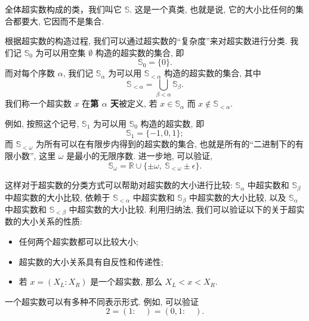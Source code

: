 全体超实数构成的类，我们叫它 $\mathbb{S}$.
这是一个真类, 也就是说, 它的大小比任何的集合都要大, 它因而不是集合.

根据超实数的构造过程, 我们可以通过超实数的``复杂度''来对超实数进行分类.
我们记 $\mathbb{S}_0$ 为可以用空集 $\emptyset$ 构造的超实数的集合, 即 \[\mathbb{S}_0=\{0\}.\]
而对每个序数 $\alpha$, 
我们记 $\mathbb{S}_\alpha$ 为可以用 $\mathbb{S}_{<\alpha}$ 构造的超实数的集合,
其中 \[\mathbb{S}_{<\alpha}=\bigcup_{\beta<\alpha}\mathbb{S}_\beta.\] 
我们称一个超实数 $x$ 在\textbf{第 $\alpha$ 天}被定义,
若 $x\in \mathbb{S}_{\alpha}$ 而 $x\notin \mathbb{S}_{<\alpha}$.

例如, 按照这个记号, $\mathbb{S}_1$ 为可以用 $\mathbb{S}_0$ 构造的超实数, 即 \[\mathbb{S}_1=\{-1,0,1\};\]
而 $\mathbb{S}_{<\omega}$ 为所有可以在有限步内得到的超实数的集合,
也就是所有的``二进制下的有限小数'', 这里 $\omega$ 是最小的无限序数. 
进一步地, 可以验证, %
\[
    \mathbb{S}_\omega = \mathbb{R} \cup \{ \pm \omega, \ \mathbb{S}_{< \omega} \pm \epsilon \}.
\]

这样对于超实数的分类方式可以帮助对超实数的大小进行比较:
$\mathbb{S}_\alpha$ 中超实数和 $\mathbb{S}_\beta$ 中超实数的大小比较,
依赖于 $\mathbb{S}_{<\alpha}$ 中超实数和 $\mathbb{S}_\beta$ 中超实数的大小比较,
以及 $\mathbb{S}_\alpha$ 中超实数和 $\mathbb{S}_{<\beta}$ 中超实数的大小比较. 
利用归纳法, 我们可以验证以下的关于超实数的大小关系的性质:

\begin{itemize}
    \item 任何两个超实数都可以比较大小;
    \item 超实数的大小关系具有自反性和传递性;
    \item 若 $x=(X_L:X_R)$ 是一个超实数, 那么 $X_L<x<X_R$. 
\end{itemize}

一个超实数可以有多种不同表示形式. 例如, 可以验证
\[ 2=(1:\quad)=(0,1:\quad). \]
  



